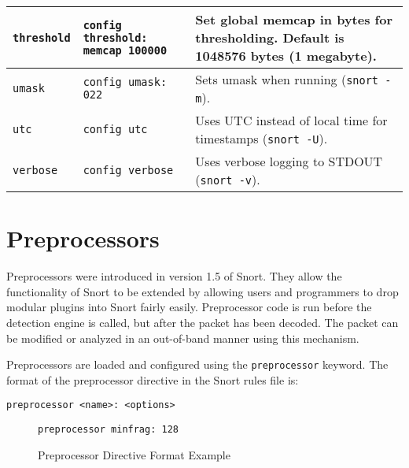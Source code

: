\documentclass[english]{report}
\newenvironment{note}{
\samepage
    \vspace{10pt}{\textsf{
        {\hspace{7pt}\Huge{$\triangle$\hspace{-12.5pt}{\Large{$^!$}}}}\hspace{5pt}
        {\Large{NOTE}}
    }
    }
   \begin{center}
    \par\vspace{-17pt}

    \begin{lrbox}{\savepar}
    \begin{minipage}[r]{6in}
}
{
    \end{minipage}
    \end{lrbox}
    \fbox{
        \usebox{
            \savepar
	}
    }
    \par\vskip10pt
    \end{center}
}
\begin{document}
\begin{center}
\begin{longtable}{| p{2in} | p{2.25in} | p{2.25in} |}
\hline
\texttt{threshold} & \texttt{config threshold: memcap 100000} & Set global memcap in bytes for thresholding. Default is 1048576 bytes (1 megabyte). \\
\hline
\texttt{umask} & \texttt{config umask: 022} & Sets umask when running (\texttt{snort -m}). \\
\hline
\texttt{utc} & \texttt{config utc} & Uses UTC instead of local time for timestamps (\texttt{snort -U}). \\
\hline
\texttt{verbose} & \texttt{config verbose} & Uses verbose logging to STDOUT (\texttt{snort -v}). \\
\hline

\end{longtable}
\end{center}


\newpage
\section{Preprocessors}

Preprocessors were introduced in version 1.5 of Snort. They allow
the functionality of Snort to be extended by allowing users and programmers
to drop modular plugins into Snort fairly easily.
Preprocessor code is run before the detection engine is called, but
after the packet has been decoded. The packet can be modified or analyzed
in an out-of-band manner using this mechanism.

Preprocessors are loaded and configured using the {\tt preprocessor} keyword.
The format of the preprocessor directive in the Snort rules file is:

\begin{verbatim}
preprocessor <name>: <options>
\end{verbatim}

\begin{figure}[!hbpt]
\begin{verbatim}
preprocessor minfrag: 128
\end{verbatim}

\caption{\label{Preprocessor Example}Preprocessor Directive Format Example}
\end{figure}
\end{document}

